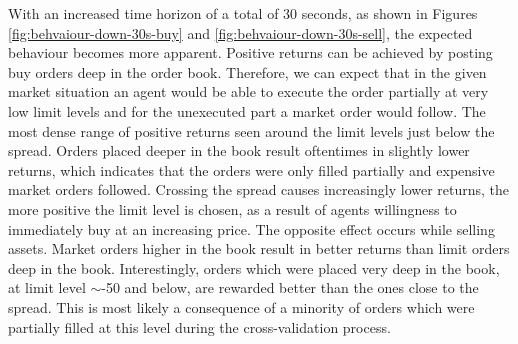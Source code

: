 With an increased time horizon of a total of 30 seconds, as shown in Figures \ref{fig:behvaiour-down-30s-buy} and \ref{fig:behvaiour-down-30s-sell}, the expected behaviour becomes more apparent.
Positive returns can be achieved by posting buy orders deep in the order book.
Therefore, we can expect that in the given market situation an agent would be able to execute the order partially at very low limit levels and for the unexecuted part a market order would follow.
The most dense range of positive returns seen around the limit levels just below the spread.
Orders placed deeper in the book result oftentimes in slightly lower returns, which indicates that the orders were only filled partially and expensive market orders followed.
Crossing the spread causes increasingly lower returns, the more positive the limit level is chosen, as a result of agents willingness to immediately buy at an increasing price.
The opposite effect occurs while selling assets.
Market orders higher in the book result in better returns than limit orders deep in the book.
Interestingly, orders which were placed very deep in the book, at limit level $\sim$-50 and below, are rewarded better than the ones close to the spread.
This is most likely a consequence of a minority of orders which were partially filled at this level during the cross-validation process.

